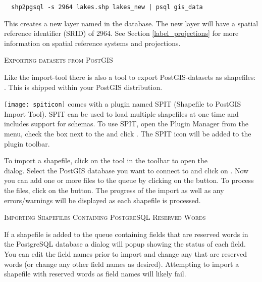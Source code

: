\begin{verbatim}
  shp2pgsql -s 2964 lakes.shp lakes_new | psql gis_data
\end{verbatim}

This creates a new layer named  in the
 database. The
new layer will have a spatial reference identifier (SRID) of 2964. See Section
\ref{label_projections} for more information on spatial reference systems and
projections.
\begin{Tip}
\caption{\textsc{Exporting datasets from PostGIS}}
Like the import-tool  there is also a tool to export
PostGIS-datasets as shapefiles: . This is shipped within your
PostGIS distribution.
\end{Tip}

\texttt{[image: spiticon]} \qg comes with a
plugin named
SPIT (Shapefile to PostGIS Import Tool).
SPIT can be used to load multiple shapefiles at one time and includes support
for schemas. To use SPIT, open the Plugin Manager from the 
menu, check the box next to the  and click . The SPIT
icon will be added to the plugin toolbar.

To import a shapefile, click on the  tool in the
toolbar to open the \\
 dialog. Select the PostGIS database
you want to connect to and click on . Now you can add one or more
files to the queue by clicking on the  button. To process the files,
click on the  button. The progress of the import as well as any
errors/warnings will be displayed as each shapefile is processed.

\begin{Tip}\caption{\textsc{Importing Shapefiles Containing
PostgreSQL Reserved Words}}
If a shapefile is added to the queue containing fields that are
reserved words in the PostgreSQL database a dialog will popup showing the
status
of each field. You can edit the field names
prior to import and change any that are reserved words (or change any other
field names as desired). Attempting to
import a shapefile with reserved words as field names will likely fail.
\end{Tip}

